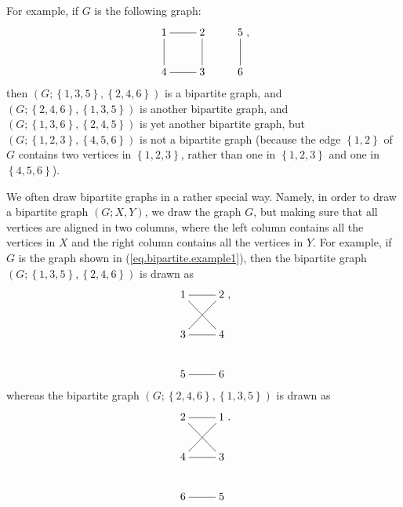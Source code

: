 \documentclass[numbers=enddot,12pt,final,onecolumn,notitlepage]{scrartcl}%
\makeatletter
\theoremstyle{definition}
\newcommand{\are}{\ar@{-}}
\makeatother
\begin{document}
For example, if $G$ is the following graph:%
\begin{equation}%
\xymatrix{
1 \are[r] \are[d] & 2 \are[d] & 5 \are[d] \\
4 \are[r] & 3 & 6
}%
, \label{eq.bipartite.example1}%
\end{equation}
then $\left(  G;\left\{  1,3,5\right\}  ,\left\{  2,4,6\right\}  \right)  $ is
a bipartite graph, and $\left(  G;\left\{  2,4,6\right\}  ,\left\{
1,3,5\right\}  \right)  $ is another bipartite graph, and $\left(  G;\left\{
1,3,6\right\}  ,\left\{  2,4,5\right\}  \right)  $ is yet another bipartite
graph, but $\left(  G;\left\{  1,2,3\right\}  ,\left\{  4,5,6\right\}
\right)  $ is not a bipartite graph (because the edge $\left\{  1,2\right\}  $
of $G$ contains two vertices in $\left\{  1,2,3\right\}  $, rather than one in
$\left\{  1,2,3\right\}  $ and one in $\left\{  4,5,6\right\}  $).

We often draw bipartite graphs in a rather special way. Namely, in order to
draw a bipartite graph $\left(  G;X,Y\right)  $, we draw the graph $G$, but
making sure that all vertices are aligned in two columns, where the left
column contains all the vertices in $X$ and the right column contains all the
vertices in $Y$. For example, if $G$ is the graph shown in
(\ref{eq.bipartite.example1}), then the bipartite graph $\left(  G;\left\{
1,3,5\right\}  ,\left\{  2,4,6\right\}  \right)  $ is drawn as%
\[%
\xymatrix{
1 \are[r] \are[rd] & 2 \\
3 \are[r] \are[ru] & 4 \\
5 \are[r] & 6
}%
,
\]
whereas the bipartite graph $\left(  G;\left\{  2,4,6\right\}  ,\left\{
1,3,5\right\}  \right)  $ is drawn as%
\[%
\xymatrix{
2 \are[r] \are[rd] & 1 \\
4 \are[r] \are[ru] & 3 \\
6 \are[r] & 5
}%
.
\]
\end{document}
